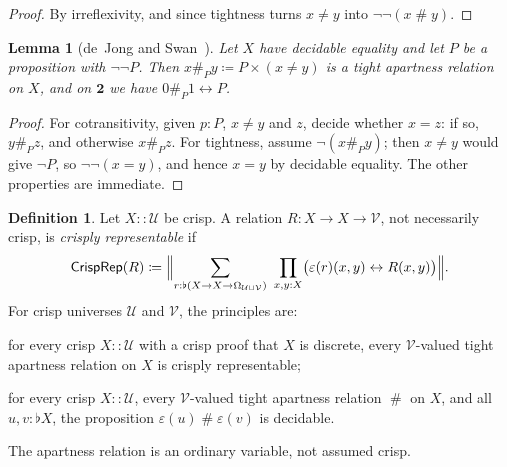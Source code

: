 \documentclass[11pt]{amsart}
\newtheorem{lemma}[theorem]{Lemma}
\theoremstyle{definition}
\newtheorem{definition}[theorem]{Definition}
\theoremstyle{remark}
\newcommand{\U}{\mathcal U}
\newcommand{\V}{\mathcal V}
\newcommand{\B}{\mathbf 2}
\newcommand{\Om}{\Omega}
\newcommand{\crisp}{\mathrel{::}}
\newcommand{\cu}{\varepsilon}
\newcommand{\CrispRep}{\mathsf{CrispRep}}
\newcommand{\Pone}{\mathsf P_1}
\newcommand{\Ptwo}{\mathsf P_2}
\newcommand{\ap}{\mathrel{\#}}
\newcommand{\apP}[1]{\mathrel{\#_{#1}}}
\begin{document}
\begin{proof}
By irreflexivity, and since tightness turns $x\neq y$ into
$\neg\neg(x\ap y)$.
\end{proof}

\begin{lemma}[{de~Jong and Swan~\cite{deJong2025,TypeTopology}}]\label{lem:dejong}
Let $X$ have decidable equality and let $P$ be a proposition with
$\neg\neg P$. Then $x\apP{P}y\coloneqq P\times(x\neq y)$ is a tight
apartness relation on $X$, and on $\B$ we have
$0\apP{P}1\leftrightarrow P$.
\end{lemma}

\begin{proof}
For cotransitivity, given $p:P$, $x\neq y$ and $z$, decide whether
$x=z$: if so, $y\apP{P}z$, and otherwise $x\apP{P}z$. For tightness,
assume $\neg(x\apP{P}y)$; then $x\neq y$ would give
$\neg P$, so $\neg\neg(x=y)$, and hence $x=y$ by decidable equality. The
other properties are immediate.
\end{proof}

\begin{definition}\label{def:principles}
Let $X\crisp\U$ be crisp. A relation $R:X\to X\to\V$, not necessarily
crisp, is \emph{crisply representable} if
\[
 \CrispRep(R)\coloneqq
 \Bigl\lVert \sum_{r:\flat(X\to X\to\Om_{\U\sqcup\V})}\
 \prod_{x,y:X}\bigl(\cu(r)(x,y)\leftrightarrow R(x,y)\bigr)\Bigr\rVert .
\]
For crisp universes $\U$ and $\V$, the principles are:
\begin{description}[font=\normalfont,leftmargin=1.5em,labelindent=0pt]
\item[$\Pone(\U,\V)$] for every crisp $X\crisp\U$ with a crisp proof
that $X$ is discrete, every $\V$-valued tight apartness relation on $X$
is crisply representable;
\item[$\Ptwo(\U,\V)$] for every crisp $X\crisp\U$, every $\V$-valued
tight apartness relation $\ap$ on $X$, and all $u,v:\flat X$, the
proposition $\cu(u)\ap\cu(v)$ is decidable.
\end{description}
The apartness relation is an ordinary variable, not assumed crisp.
\end{definition}
\end{document}
